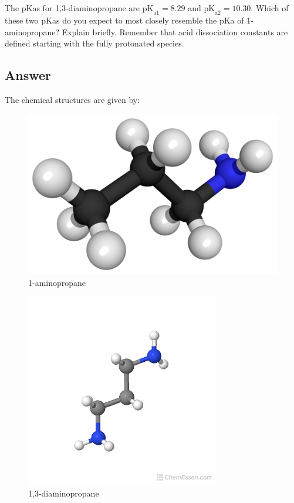 \documentclass[12pt]{article}
\begin{document}
\section{}
The pKas for 1,3-diaminopropane are $\mathrm{pK}_{\mathrm{a} 1}=8.29$ and $\mathrm{pK}_{\mathrm{a} 2}=10.30$. Which of these two pKas do you expect to most closely resemble the pKa of 1-aminopropane? Explain briefly. Remember that acid dissociation constants are defined starting with the fully protonated species.
\subsection{Answer}
The chemical structures are given by:\\
\begin{figure}[h]
  \centering
  \includegraphics[width=\textwidth]{amine.png}
  \caption{1-aminopropane}
\end{figure}
\begin{figure}[h]
  \centering
  \includegraphics[width=\textwidth]{dia.png}
  \caption{1,3-diaminopropane}
\end{figure}
\end{document}
